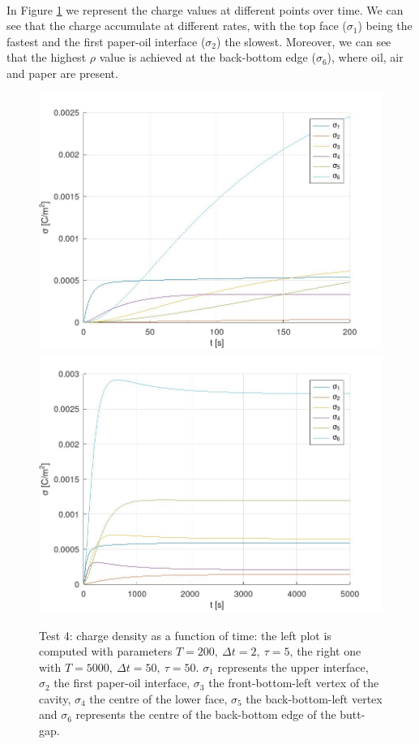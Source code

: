 \documentclass{Configuration_Files/PoliMi3i_thesis}
\begin{document}
\\In Figure \ref{fig: 4.3} we represent the charge values at different points over time. We can see that the charge accumulate at different rates, with the top face ($\sigma_1$) being the fastest and the first paper-oil interface ($\sigma_2$) the slowest. Moreover, we can see that the highest $\rho$ value is achieved at the back-bottom edge ($\sigma_6$), where oil, air and paper are present.
\begin{figure}[h!]
    \centering
   \includegraphics[scale=0.2]{Images/4.rho_time_fast_new.jpeg}
   \includegraphics[scale=0.2]{Images/4.rho_time_new.jpeg}
    \caption {Test 4: charge density as a function of time: the left plot is computed with parameters $T=200,\ \Delta t=2,\ \tau=5$, the right one with $T=5000,\ \Delta t=50,\ \tau=50$. $\sigma_1$ represents the upper interface, $\sigma_2$ the first paper-oil interface, $\sigma_3$ the front-bottom-left vertex of the cavity, $\sigma_4$ the centre of the lower face, $\sigma_5$ the back-bottom-left vertex and $\sigma_6$ represents the centre of the back-bottom edge of the butt-gap.}
    \label{fig: 4.3}
\end{figure}
\end{document}
